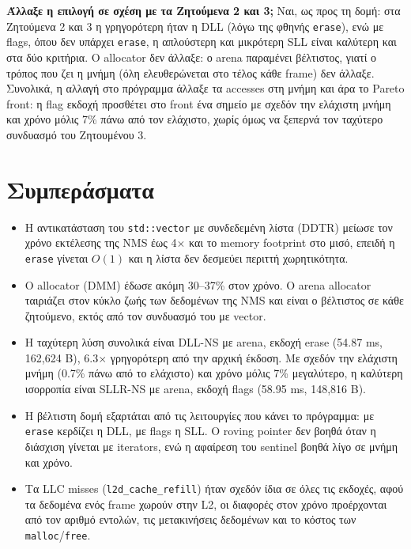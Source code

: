 \documentclass[11pt,a4paper]{article}
\newcommand{\en}[1]{\textlatin{#1}}
\begin{document}
\textbf{Άλλαξε η επιλογή σε σχέση με τα Ζητούμενα 2 και 3;} Ναι, ως προς τη δομή: στα Ζητούμενα 2 και 3 η γρηγορότερη ήταν η \en{DLL} (λόγω της φθηνής \en{\texttt{erase}}), ενώ με \en{flags}, όπου δεν υπάρχει \en{\texttt{erase}}, η απλούστερη και μικρότερη \en{SLL} είναι καλύτερη και στα δύο κριτήρια. Ο \en{allocator} δεν άλλαξε: ο \en{arena} παραμένει βέλτιστος, γιατί ο τρόπος που ζει η μνήμη (όλη ελευθερώνεται στο τέλος κάθε \en{frame}) δεν άλλαξε. Συνολικά, η αλλαγή στο πρόγραμμα άλλαξε τα \en{accesses} στη μνήμη και άρα το \en{Pareto front}: η \en{flag} εκδοχή προσθέτει στο \en{front} ένα σημείο με σχεδόν την ελάχιστη μνήμη και χρόνο μόλις 7\% πάνω από τον ελάχιστο, χωρίς όμως να ξεπερνά τον ταχύτερο συνδυασμό του Ζητουμένου 3.

\section{Συμπεράσματα}
\begin{itemize}
    \item Η αντικατάσταση του \en{\texttt{std::vector}} με συνδεδεμένη λίστα (\en{DDTR}) μείωσε τον χρόνο εκτέλεσης της \en{NMS} έως 4$\times$ και το \en{memory footprint} στο μισό, επειδή η \en{\texttt{erase}} γίνεται $O(1)$ και η λίστα δεν δεσμεύει περιττή χωρητικότητα.
    \item Ο \en{allocator} (\en{DMM}) έδωσε ακόμη 30--37\% στον χρόνο. Ο \en{arena allocator} ταιριάζει στον κύκλο ζωής των δεδομένων της \en{NMS} και είναι ο βέλτιστος σε κάθε ζητούμενο, εκτός από τον συνδυασμό του με \en{vector}.
    \item Η ταχύτερη λύση συνολικά είναι \en{DLL-NS} με \en{arena}, εκδοχή \en{erase} (54.87 \en{ms}, 162{,}624 \en{B}), 6.3$\times$ γρηγορότερη από την αρχική έκδοση. Με σχεδόν την ελάχιστη μνήμη (0.7\% πάνω από το ελάχιστο) και χρόνο μόλις 7\% μεγαλύτερο, η καλύτερη ισορροπία είναι \en{SLLR-NS} με \en{arena}, εκδοχή \en{flags} (58.95 \en{ms}, 148{,}816 \en{B}).
    \item Η βέλτιστη δομή εξαρτάται από τις λειτουργίες που κάνει το πρόγραμμα: με \en{\texttt{erase}} κερδίζει η \en{DLL}, με \en{flags} η \en{SLL}. Ο \en{roving pointer} δεν βοηθά όταν η διάσχιση γίνεται με \en{iterators}, ενώ η αφαίρεση του \en{sentinel} βοηθά λίγο σε μνήμη και χρόνο.
    \item Τα \en{LLC misses} (\en{\texttt{l2d\_cache\_refill}}) ήταν σχεδόν ίδια σε όλες τις εκδοχές, αφού τα δεδομένα ενός \en{frame} χωρούν στην \en{L2}, οι διαφορές στον χρόνο προέρχονται από τον αριθμό εντολών, τις μετακινήσεις δεδομένων και το κόστος των \en{\texttt{malloc}/\texttt{free}}.
\end{itemize}
\end{document}

